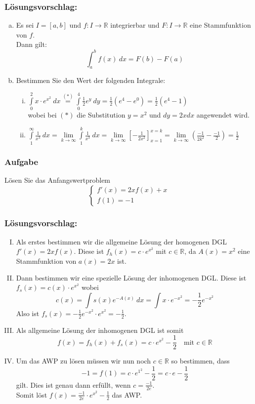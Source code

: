 \documentclass[a4paper,11pt]{scrartcl}
\newcounter{auf}
\newcommand{\Aufgabe}%
        {\addtocounter{auf}{1} \subsubsection*{\rmfamily  Aufgabe \theauf \hspace{1em}} }
\newcommand{\RR}{\mathbb{R}}
\begin{document}
\subsubsection*{Lösungsvorschlag:}
\begin{enumerate}[a)]
\item Es sei $I=[a,b]$ und $f: I \to \RR$ integrierbar und $F: I \to \RR$ eine Stammfunktion von $f$. \\ Dann gilt:
$$
\int_a^b f(x) \ dx=F(b)-F(a)
$$
\item Bestimmen Sie den Wert der folgenden Integrale:
\begin{enumerate}[(i)]
\item \quad$\displaystyle\int \limits_{0}^2 x\cdot e^{x^2} \ dx \stackrel{(*)}{=} \displaystyle\int \limits_0^4 \frac{1}{2}e^y \ dy= \frac{1}{2}(e^4-e^0)= \frac{1}{2}(e^4-1)$\\
wobei bei $(*)$ die Substitution $y=x^2$ und $dy=2xdx$ angewendet wird.
\item \quad$\displaystyle\int \limits_{1}^\infty \frac{1}{x^3}\ dx = \lim \limits_{k \to \infty} \displaystyle\int \limits_{1}^k \frac{1}{x^3}\ dx=\lim \limits_{k \to \infty} \left[- \frac{1}{2x^2}\right]_{x=1}^{x=k}=\lim \limits_{k \to \infty}\left( \frac{-1}{2k^2}-\frac{-1}{2}\right)=\frac{1}{2}$
\end{enumerate}
\end{enumerate}



\newpage
\Aufgabe
Lösen Sie das Anfangswertproblem
$$
\begin{cases} f'(x)=2xf(x)+x\\
f(1)=-1 \end{cases}
$$


\subsubsection*{Lösungsvorschlag:}
\begin{enumerate}[(I)]
\item Als erstes bestimmen wir die allgemeine Lösung der homogenen DGL $f'(x)=2xf(x)$. Diese ist $f_h(x)=c\cdot e^{x^2}$ mit $c \in \RR$, da $A(x)=x^2$ eine Stammfunktion von $a(x)=2x$ ist.
\item Dann bestimmen wir eine spezielle Lösung der inhomogenen DGL. Diese ist $f_s(x)=c(x)\cdot e^{x^2}$ wobei
$$
c(x)=\int s(x)e^{-A(x)}\ dx=\int x \cdot e^{-x^2}=-\frac{1}{2}e^{-x^2}
$$
Also ist $f_s(x)=-\frac{1}{2}e^{-x^2}\cdot e^{x^2} = -\frac{1}{2}$.
\item Als allgemeine Lösung der inhomogenen DGL ist somit
$$
f(x)=f_h(x)+f_s(x)=c\cdot e^{x^2}-\frac{1}{2} \quad \text{mit } c \in \RR
$$
\item Um das AWP zu lösen müssen wir nun noch $c \in \RR$ so bestimmen, dass
$$
-1=f(1)=c\cdot e^{1^2}-\frac{1}{2}=c\cdot e - \frac{1}{2}
$$
gilt. Dies ist genau dann erfüllt, wenn $c=\frac{-1}{2e}$.\\
Somit löst $f(x)=\frac{-1}{2e}\cdot e^{x^2}-\frac{1}{2}$ das AWP.
\end{enumerate}
%
%
\end{document}
